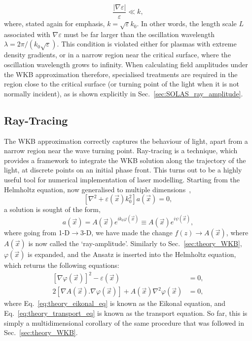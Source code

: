 \begin{equation}
    \frac{|\nabla \varepsilon|}{\varepsilon} \ll k,
\end{equation}
where, stated again for emphasis, $k=\sqrt{\varepsilon}k_0$.
In other words, the length scale $L$ associated with $\nabla\varepsilon$ must be far larger than the oscillation wavelength $\lambda = 2\pi/(k_0\sqrt{\varepsilon})$.
This condition is violated either for plasmas with extreme density gradients, or in a narrow region near the critical surface, where the oscillation wavelength grows to infinity.
When calculating field amplitudes under the WKB approximation therefore, specialised treatments are required in the region close to the critical surface (or turning point of the light when it is not normally incident), as is shown explicitly in Sec.~\ref{sec:SOLAS_ray_amplitude}.

\subsection{Ray-Tracing}%
\label{sec:theory_rays}

The WKB approximation correctly captures the behaviour of light, apart from a narrow region near the wave turning point.
Ray-tracing is a technique, which provides a framework to integrate the WKB solution along the trajectory of the light, at discrete points on an initial phase front.
This turns out to be a highly useful tool for numerical implementation of laser modelling.
Starting from the Helmholtz equation, now generalised to multiple dimensions~\cite{colaitis_modeling_2014},
\begin{equation}
    \left[ \nabla^2 + \varepsilon(\vec{x})k_0^2 \right] a(\vec{x}) = 0,
\end{equation}
a solution is sought of the form,
\begin{equation}
    a(\vec{x}) = A(\vec{x}) e^{i k_0 \varphi(\vec{x})} \equiv A(\vec{x}) e^{i \psi(\vec{x})},
\end{equation}
where going from 1-D$\rightarrow$3-D, we have made the change $f(z)\rightarrow A(\vec{x})$, where $A(\vec{x})$ is now called the `ray-amplitude'.
Similarly to Sec.~\ref{sec:theory_WKB}, $\varphi(\vec{x})$ is expanded, and the Ansatz is inserted into the Helmholtz equation, which returns the following equations:
\begin{align}
    \label{eq:theory_eikonal_eq}
    \left[\nabla \varphi(\vec{x})\right]^2  - \varepsilon(\vec{x}) &= 0,\\
    \label{eq:theory_transport_eq}
    2\left[\nabla A(\vec{x}) . \nabla \varphi (\vec{x}) \right] + A(\vec{x}) \nabla^2 \varphi(\vec{x}) &= 0,
\end{align}
where Eq.~\ref{eq:theory_eikonal_eq} is known as the Eikonal equation, and Eq.~\ref{eq:theory_transport_eq} is known as the transport equation.
So far, this is simply a multidimensional corollary of the same procedure that was followed in Sec.~\ref{sec:theory_WKB}.


